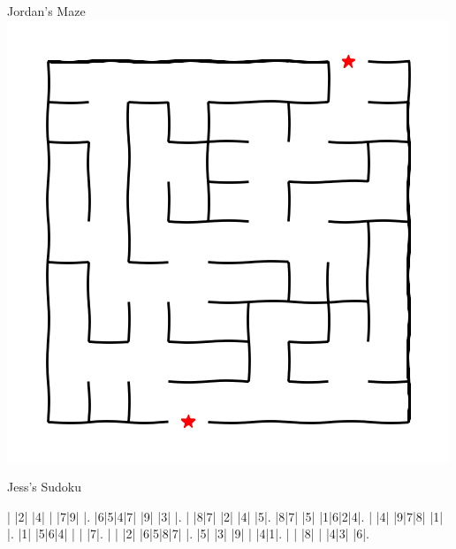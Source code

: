 \documentclass{article}
\begin{document}
\begin{multicols}{3}
Jordan's Maze\vspace{-0.5cm}
\center\includegraphics[width=\linewidth]{images/maze_j.png}

\renewcommand*\sudokuformat[1]{\sffamily#1}
\setlength\sudokusize{5cm}
\setlength\sudokuthickline{1pt}
Jess's Sudoku\vspace{0.2cm}
\begin{sudoku-block}
| |2| |4| | |7|9| |.
|6|5|4|7| |9| |3| |.
| |8|7| |2| |4| |5|.
|8|7| |5| |1|6|2|4|.
| |4| |9|7|8| |1| |.
|1| |5|6|4| | | |7|.
| | |2| |6|5|8|7| |.
|5| |3| |9| | |4|1|.
| | |8| | |4|3| |6|.
\end{sudoku-block}

\end{multicols}
\end{document}
